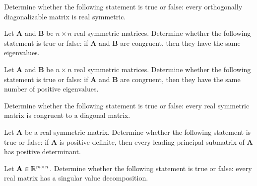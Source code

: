 \documentclass[11pt,oneside]{article}
\begin{document}
\begin{problem}
Determine whether the following statement is true or false: every orthogonally diagonalizable matrix is real symmetric.
\end{problem}

\begin{problem}
Let $\mathbf A$ and $\mathbf B$ be $n\times n$ real symmetric matrices. Determine whether the following statement is true or false: if $\mathbf A$ and $\mathbf B$ are congruent, then they have the same eigenvalues.
\end{problem}

\begin{problem}
Let $\mathbf A$ and $\mathbf B$ be $n\times n$ real symmetric matrices. Determine whether the following statement is true or false: if $\mathbf A$ and $\mathbf B$ are congruent, then they have the same number of positive eigenvalues.
\end{problem}

\begin{problem}
Determine whether the following statement is true or false: every real symmetric matrix is congruent to a diagonal matrix.
\end{problem}

\begin{problem}
Let $\mathbf A$ be a real symmetric matrix. Determine whether the following statement is true or false: if $\mathbf A$ is positive definite, then every leading principal submatrix of $\mathbf A$ has positive determinant.
\end{problem}

\begin{problem}
Let $\mathbf A\in\mathbb{R}^{m\times n}$. Determine whether the following statement is true or false: every real matrix has a singular value decomposition.
\end{problem}
\end{document}
